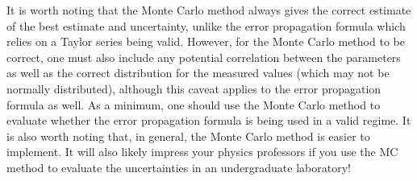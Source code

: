 It is worth noting that the Monte Carlo method always gives the correct estimate of the best estimate and uncertainty, unlike the error propagation formula which relies on a Taylor series being valid. However, for the Monte Carlo method to be correct, one must also include any potential correlation between the parameters as well as the correct distribution for the measured values (which may not be normally distributed), although this caveat applies to the error propagation formula as well. As a minimum, one should use the Monte Carlo method to evaluate whether the error propagation formula is being used in a valid regime. It is also worth noting that, in general, the Monte Carlo method is easier to implement. It will also likely impress your physics professors if you use the MC method to evaluate the uncertainties in an undergraduate laboratory!




